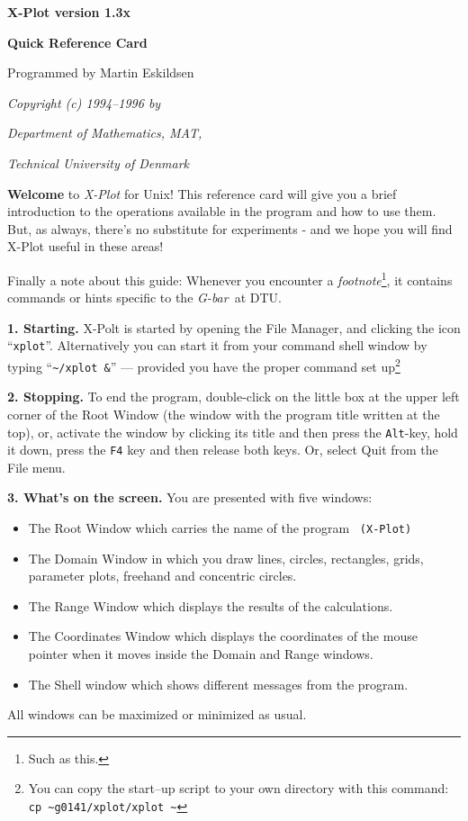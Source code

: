 \documentclass[10pt,a4paper]{article}
\begin{document}
\centerline{\bf X-Plot version 1.3x}
\vskip 1cm
\centerline{\bf Quick Reference Card}
\vskip 1cm
\centerline{Programmed by Martin Eskildsen}
\vskip 1cm
\centerline{\it Copyright (c) 1994--1996 by}
\vskip 0.5cm
\centerline{\it Department of Mathematics, MAT,}
\centerline{\it Technical University of Denmark}

\parskip 0.5cm

{\bf Welcome} to {\it X-Plot} for Unix! This reference card will give
you a brief introduction to the operations available in the program
and how to use them. But, as always, there's no substitute for
experiments - and we hope you will find X-Plot useful in these areas!

Finally a note about this guide: Whenever you encounter a {\it
footnote}\footnote{Such as this.}, it contains commands or hints
specific to the {\it G-bar}\ at DTU.



{\bf 1. Starting.} X-Polt is started by opening the File Manager, and
clicking the icon ``{\tt xplot}''. Alternatively you can start it from
your command shell window by typing ``{\tt \~{}/xplot \&}'' ---
provided you have the proper command set up\footnote{You can copy the
start--up script to your own directory with this command: {\tt
cp~\~{}g0141/xplot/xplot~\~{}}}



{\bf 2. Stopping.} To end the program, double-click on the little box
at the upper left corner of the Root Window (the window with the
program title written at the top), or, activate the window by clicking
its title and then press the {\tt Alt}-key, hold it down, press the
{\tt F4} key and then release both keys. Or, select Quit from the File
menu.



{\bf 3. What's on the screen.} You are presented with five windows:
\begin{itemize}
\item The Root Window which carries the name of the program {\tt
(X-Plot)}
\item The Domain Window in which you draw lines, circles, rectangles,
grids, parameter plots, freehand and concentric circles.
\item The Range Window which displays the results of the calculations.
\item The Coordinates Window which displays the coordinates of the
mouse pointer when it moves inside the Domain and Range windows.
\item The Shell window which shows different messages from the
program.
\end{itemize}
All windows can be maximized or minimized as usual.
\end{document}
